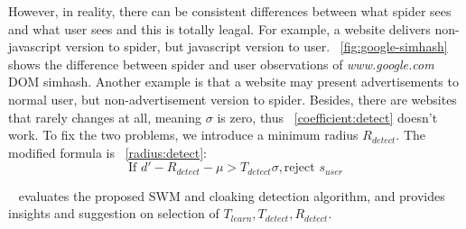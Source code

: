 However, in reality, there can be consistent differences between what spider
sees and what user sees and this is totally leagal. For example, a website
delivers non-javascript version to spider, but javascript version to user.
~\autoref{fig:google-simhash} shows the difference between spider and user
observations of {\it www.google.com} DOM simhash. Another example is that a website may
present advertisements to normal user, but non-advertisement version to spider.
Besides, there are websites that rarely changes at all, meaning $\sigma$ is
zero, thus ~\autoref{coefficient:detect} doesn't work. To fix the two problems, we introduce
a minimum radius $R_{detect}$. The modified formula is ~\autoref{radius:detect}:
\begin{equation}
  \label{radius:detect}
  \text{If } d' - R_{detect} - \mu > T_{detect} \sigma, \text{reject } s_{user}
\end{equation}

~\label{s:evaluation} evaluates the proposed SWM and cloaking detection
algorithm, and provides insights and suggestion on selection of $T_{learn}, T_{detect},
R_{detect}$.




